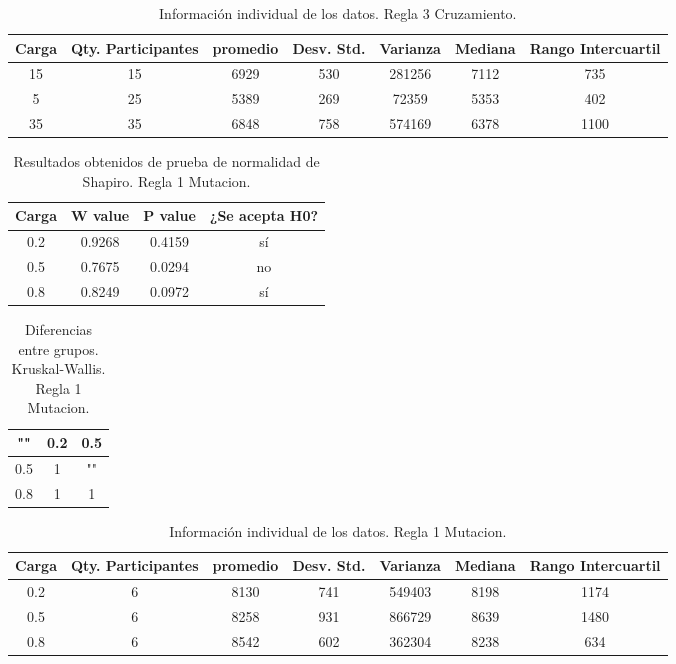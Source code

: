 \documentclass{article}
\begin{document}
\begin{table}[htb]
    \centering
    \caption{Informaci\'on individual de los datos. Regla 3 Cruzamiento.} 
    \begin{tabular}{|c|c|c|c|c|c|c|}
    \hline
    Carga & Qty. Participantes & promedio & Desv. Std. & Varianza & Mediana & Rango Intercuartil  \\
    \hline
    15 & 15 & 6929 & 530 & 281256 & 7112 & 735 \\
    \hline
    5 & 25 & 5389 & 269 & 72359 & 5353 & 402 \\
    \hline
    35 & 35 & 6848 & 758 & 574169 & 6378 & 1100 \\
    \hline
\end{tabular}
    \label{cuadro 9}
\end{table}



\begin{table}[ht]
    \centering
    \caption{Resultados obtenidos de prueba de normalidad de Shapiro. Regla 1 Mutacion.} 
    \begin{tabular}{|c|c|c|c|}
    \hline
    Carga & W value & P value & ¿Se acepta H0?  \\
    \hline
    0.2 & 0.9268 & 0.4159 & s\'i \\
    \hline 
     0.5 & 0.7675 & 0.0294 &  no \\
    \hline 
    0.8 & 0.8249 & 0.0972 & s\'i \\
    \hline 
\end{tabular}
    \label{cuadro 10}
\end{table}

\begin{table}[htb]
    \centering
    \caption{Diferencias entre grupos. Kruskal-Wallis. Regla 1 Mutacion.} 
    \begin{tabular}{|c|c|c|}
    \hline
    "" & 0.2 & 0.5 \\
    \hline
    0.5 & 1 & ""  \\
    \hline
    0.8 & 1 & 1  \\
    \hline
\end{tabular}
    \label{cuadro 11}
\end{table}

\begin{table}[htb]
    \centering
    \caption{Informaci\'on individual de los datos. Regla 1 Mutacion.} 
    \begin{tabular}{|c|c|c|c|c|c|c|}
    \hline
    Carga & Qty. Participantes & promedio & Desv. Std. & Varianza & Mediana & Rango Intercuartil  \\
    \hline
    0.2 & 6 & 8130 & 741 & 549403 & 8198 & 1174 \\
    \hline
    0.5 & 6 & 8258 & 931 & 866729 & 8639 & 1480 \\
    \hline
    0.8 & 6 & 8542 & 602 & 362304 & 8238 & 634 \\
    \hline
\end{tabular}
    \label{cuadro 12}
\end{table}
\end{document}
